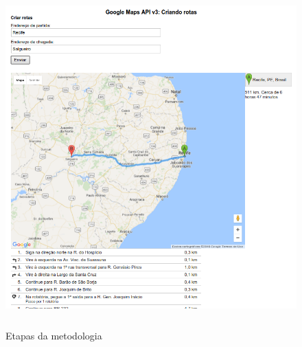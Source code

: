 \begin{figure}[ht]
\centering
\caption{Etapas da metodologia}
\includegraphics[width=150mm, height=130mm]{Figuras/Cronograma/GoogleMaps.png}
\end{figure}
 

 
 
 


 



